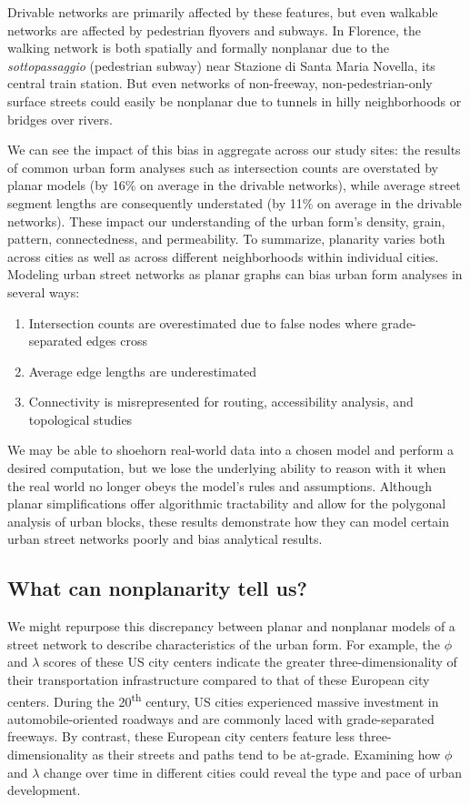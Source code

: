 \documentclass[Afour,sageh,times]{sagej}
\begin{document}
Drivable networks are primarily affected by these features, but even walkable networks are affected by pedestrian flyovers and subways. In Florence, the walking network is both spatially and formally nonplanar due to the \textit{sottopassaggio} (pedestrian subway) near Stazione di Santa Maria Novella, its central train station. But even networks of non-freeway, non-pedestrian-only surface streets could easily be nonplanar due to tunnels in hilly neighborhoods or bridges over rivers.

We can see the impact of this bias in aggregate across our study sites: the results of common urban form analyses such as intersection counts are overstated by planar models (by 16\% on average in the drivable networks), while average street segment lengths are consequently understated (by 11\% on average in the drivable networks). These impact our understanding of the urban form's density, grain, pattern, connectedness, and permeability. To summarize, planarity varies both across cities as well as across different neighborhoods within individual cities. Modeling urban street networks as planar graphs can bias urban form analyses in several ways:

\begin{enumerate}
	\item{Intersection counts are overestimated due to false nodes where grade-separated edges cross}
	\item{Average edge lengths are underestimated}
	\item{Connectivity is misrepresented for routing, accessibility analysis, and topological studies}
\end{enumerate}

We may be able to shoehorn real-world data into a chosen model and perform a desired computation, but we lose the underlying ability to reason with it when the real world no longer obeys the model's rules and assumptions. Although planar simplifications offer algorithmic tractability and allow for the polygonal analysis of urban blocks, these results demonstrate how they can model certain urban street networks poorly and bias analytical results.

\subsection{What can nonplanarity tell us?}

We might repurpose this discrepancy between planar and nonplanar models of a street network to describe characteristics of the urban form. For example, the $\phi$ and $\lambda$ scores of these US city centers indicate the greater three-dimensionality of their transportation infrastructure compared to that of these European city centers. During the 20\textsuperscript{th} century, US cities experienced massive investment in automobile-oriented roadways and are commonly laced with grade-separated freeways. By contrast, these European city centers feature less three-dimensionality as their streets and paths tend to be at-grade. Examining how $\phi$ and $\lambda$ change over time in different cities could reveal the type and pace of urban development.
\end{document}
